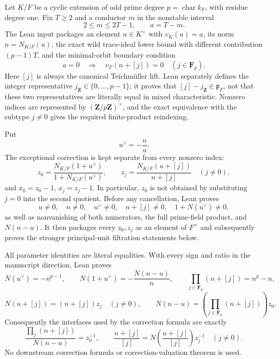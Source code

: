 \begin{definition}\label{mod:cases-wildodd-correctionunits}
Let $K/F$ be a cyclic extension of odd prime degree
$p=\operatorname{char}k_F$, with residue degree one.  Fix $T\geq2$ and a
conductor $m$ in the nonstable interval
\[
  2\leq m\leq 2T-1,
  \qquad a=T-m.
\]
The Lean input packages an element $u\in K^\times$ with
$v_K(u)=a$, its norm $n=N_{K/F}(u)$, the exact wild trace-ideal lower
bound with different contribution $(p-1)T$, and the minimal-orbit boundary
condition
\[
  a=0\quad\Longrightarrow\quad
  v_F(n+[j])=0\quad(j\in\mathbf F_p).
\]
Here $[j]$ is always the canonical Teichmüller lift.  Lean separately
defines the integer representative $j_{\mathbf Z}\in\{0,\ldots,p-1\}$;
it proves that $[j]-j_{\mathbf Z}\in\mathfrak p_F$, not that these two
representatives are literally equal in mixed characteristic.  Nonzero
indices are represented by $(\mathbf Z/p\mathbf Z)^\times$, and the exact
equivalence with the subtype $j\ne0$ gives the required finite-product
reindexing.

Put
\[
  u^\vee=-\frac{n}{u}.
\]
The exceptional correction is kept separate from every nonzero index:
\begin{equation}\label{eq:lean-wildodd-correction-units}
  z_0=\frac{N_{K/F}(1+u^\vee)}{1+N_{K/F}(u^\vee)},
  \qquad
  z_j=\frac{N_{K/F}(u+[j])}{n+[j]}
  \quad(j\ne0),
\end{equation}
and $x_0=z_0-1$, $x_j=z_j-1$.  In particular, $z_0$ is not obtained by
substituting $j=0$ into the second quotient.  Before any cancellation,
Lean proves
\[
 u\ne0,\quad n\ne0,\quad u^\vee\ne0,\quad
 n+[j]\ne0,\quad 1+N(u^\vee)\ne0,
\]
as well as nonvanishing of both numerators, the full prime-field product,
and $N(n-u)$.  It then packages every $z_0,z_j$ as an element of
$F^\times$ and subsequently proves the stronger principal-unit filtration
statements below.

All parameter identities are literal equalities.  With every sign and
ratio in the manuscript direction, Lean proves
\[
 N(u^\vee)=-n^{p-1},
 \qquad
 N(1+u^\vee)=-\frac{N(n-u)}{n},
 \qquad
 \prod_{j\in\mathbf F_p}(n+[j])=n^p-n,
\]
\[
 N(u+[j])=(n+[j])z_j\quad(j\ne0),
 \qquad
 N(n-u)=\left(\prod_{j\in\mathbf F_p}(n+[j])\right)z_0.
\]
Consequently the interfaces used by the correction formula are exactly
\[
 \frac{\prod_j(n+[j])}{N(n-u)}=z_0^{-1},
 \qquad
 \frac{n+[j]}{[j]}=
 N\!\left(\frac{u+[j]}{[j]}\right)z_j^{-1}
 \quad(j\ne0).
\]
No downstream correction formula or correction-valuation theorem is used.


\end{definition}
